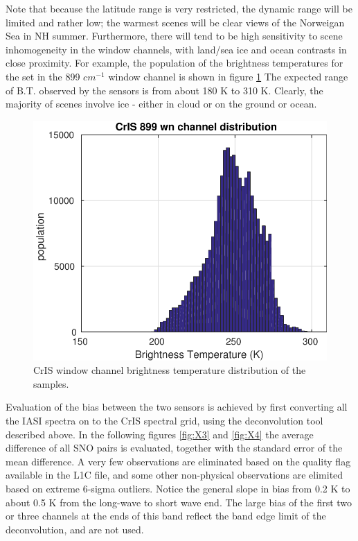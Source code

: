 \documentclass[11pt]{article}
\begin{document}
Note that because the latitude range is very restricted, the dynamic range will be limited and rather low; the warmest scenes will be clear views of the Norweigan Sea in NH summer.  Furthermore, there will tend to be high sensitivity to scene inhomogeneity in the window channels, with land/sea ice and ocean contrasts in close proximity. For example, the population of
the brightness temperatures for the set in the 899 \(cm^{-1}\) window channel is shown in figure \ref{fig:X2}
The expected range of B.T. observed by the sensors is from about 180 K to 310 K. Clearly,
the majority of scenes involve ice - either in cloud or on the ground or ocean.

\begin{figure}[htb]
\centering
\includegraphics[width=.6\linewidth]{./figs/IC_sno_CrIS_900wn_hist.pdf}
\caption{\label{fig:orgparagraph4}
  CrIS window channel brightness temperature distribution of the samples.}
\label{fig:X2}
\end{figure}

Evaluation of the bias between the two sensors is achieved by first converting all the
IASI spectra on to the CrIS spectral grid, using the deconvolution tool described above.
In the following figures \ref{fig:X3} and \ref{fig:X4} the average difference of all SNO pairs
is evaluated, together with the standard error of the mean difference. A very few
observations are eliminated based on the quality flag available in the L1C file, and some other non-physical observations are elimited based on extreme 6-sigma outliers. Notice the general slope in bias from 0.2 K to about 0.5 K from the long-wave to short wave end. The large bias of the first two or three channels at the ends of this band reflect the band edge limit of the deconvolution, and are not used.
\end{document}
